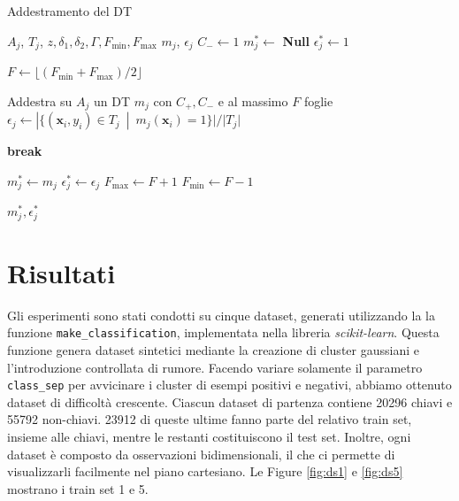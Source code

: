 \begin{algorithm}[ht]
    \caption{Addestramento del DT}
    \begin{algorithmic}[1]
        \Require $A_j$, $T_j$, $z, \delta_1, \delta_2, \Gamma, F_{\text{min}}, F_{\text{max}}$
        \Ensure $m_j$, $\epsilon_j$
        \State $C_- \gets 1$
        \State $m_j^* \gets $ \textbf{Null}
        \State $\epsilon_j^* \gets 1$
        
            \State $F \gets \lfloor (F_{\text{min}} + F_{\text{max}})/2 \rfloor$
    
                \State Addestra su $A_j$ un DT $m_j$ con $C_+, C_-$ e al massimo $F$ foglie
                \State $\epsilon_j \gets |\{(\mathbf{x}_i, y_i) \in T_j \enspace | \enspace m_j(\mathbf{x}_i) = 1 \}|/|T_j|$
    
                    \State \textbf{break}
                \EndIf
            \EndFor

                \State $m_j^* \gets m_j$
                \State $\epsilon_j^* \gets \epsilon_j$
                \State $F_{\text{max}} \gets F+1$
            \Else
                \State $F_{\text{min}} \gets F-1$
            \EndIf
            
        \EndWhile
        
        \State \Return $m_j^*, \epsilon_j^*$ 
    \end{algorithmic}
    \label{alg:addestramento-dt}
\end{algorithm}











\section{Risultati}
Gli esperimenti sono stati condotti su cinque dataset, generati utilizzando la la funzione \texttt{make\_classification}, implementata nella libreria \textit{scikit-learn}.
Questa funzione genera dataset sintetici mediante la creazione di cluster gaussiani e l'introduzione controllata di rumore.
Facendo variare solamente il parametro \texttt{class\_sep} per avvicinare i cluster di esempi positivi e negativi, abbiamo ottenuto dataset di difficoltà crescente.
Ciascun dataset di partenza contiene 20296 chiavi e 55792 non-chiavi. 23912 di queste ultime fanno parte del relativo train set, insieme alle chiavi, mentre le restanti costituiscono il test set. Inoltre, ogni dataset è composto da osservazioni bidimensionali, il che ci permette di visualizzarli facilmente nel piano cartesiano. Le Figure \ref{fig:ds1} e \ref{fig:ds5} mostrano i train set 1 e 5.

